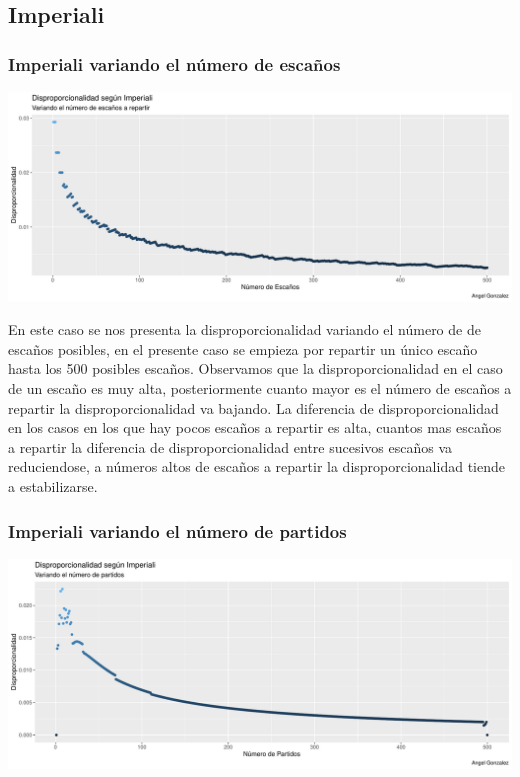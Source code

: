 \documentclass[12pt,a4paper,]{book}
\numberwithin{dummy}{section}
\theoremstyle{ocrenumbox}
\theoremstyle{blacknumex}
\theoremstyle{blacknumbox}
\theoremstyle{ocrenum}
\theoremstyle{ocrenum}
\begin{document}
\hypertarget{imperiali}{%
\subsection{Imperiali}\label{imperiali}}

\hypertarget{imperiali-variando-el-nuxfamero-de-escauxf1os}{%
\subsubsection{Imperiali variando el número de
escaños}\label{imperiali-variando-el-nuxfamero-de-escauxf1os}}

\begin{center}\includegraphics[width=0.95\linewidth]{figurasR/unnamed-chunk-24-1} \end{center}

En este caso se nos presenta la disproporcionalidad variando el número
de de escaños posibles, en el presente caso se empieza por repartir un
único escaño hasta los 500 posibles escaños. Observamos que la
disproporcionalidad en el caso de un escaño es muy alta, posteriormente
cuanto mayor es el número de escaños a repartir la disproporcionalidad
va bajando. La diferencia de disproporcionalidad en los casos en los que
hay pocos escaños a repartir es alta, cuantos mas escaños a repartir la
diferencia de disproporcionalidad entre sucesivos escaños va
reduciendose, a números altos de escaños a repartir la
disproporcionalidad tiende a estabilizarse.

\hypertarget{imperiali-variando-el-nuxfamero-de-partidos}{%
\subsubsection{Imperiali variando el número de
partidos}\label{imperiali-variando-el-nuxfamero-de-partidos}}

\begin{center}\includegraphics[width=0.95\linewidth]{figurasR/unnamed-chunk-25-1} \end{center}
\end{document}
